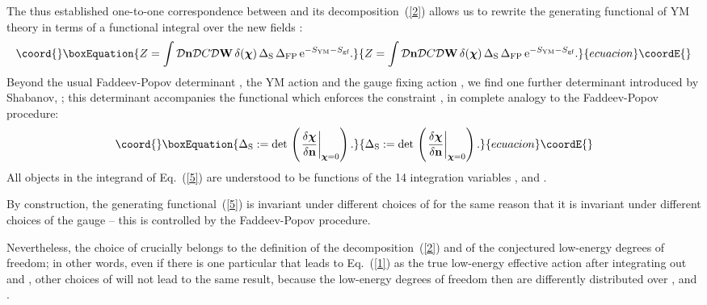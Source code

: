 \documentclass[a4paper,12pt]{article}
\providecommand{\E}{\text{e}}
\providecommand{\re}[1]{~(\ref{#1})}\usepackage{useful_macros}
\begin{document}
The thus established one-to-one correspondence between \myHighlight{$\mA_\mu$}\coordHE{} and
its decomposition\re{2} allows us to rewrite the generating functional
of YM theory in terms of a functional integral over the new fields
\cite{Shabanov:1999xy,Shabanov:1999uv}:
\begin{equation}\coord{}\boxEquation{
Z=\int{\cal D}\mn{\cal D}C{\cal D}\mW\, \delta(\mX)\,
\Delta_{\text{S}}\, \Delta_{\text{FP}}\,\E^{-S_{\text{YM}}
  -S_{\text{gf}}}.\label{5} 
}{
Z=\int{\cal D}\mn{\cal D}C{\cal D}\mW\, \delta(\mX)\,
\Delta_{\text{S}}\, \Delta_{\text{FP}}\,\E^{-S_{\text{YM}}
  -S_{\text{gf}}}.}{ecuacion}\coordE{}\end{equation}
Beyond the usual Faddeev-Popov determinant \coordHE{}, the
YM action \coordHE{} and the gauge fixing action \coordHE{},
we find one further determinant introduced by Shabanov, 
\coordHE{}; this determinant accompanies the \myHighlight{$\delta$}\coordHE{}
functional which enforces the constraint \coordHE{}, in complete analogy
to the Faddeev-Popov procedure:
\begin{equation}\coord{}\boxEquation{
\Delta_{\text{S}}:= \text{det}\, \left(\left.\frac{\delta \mX}{\delta
      \mn} \right|_{\mX=0} \right). \label{6}
}{
\Delta_{\text{S}}:= \text{det}\, \left(\left.\frac{\delta \mX}{\delta
      \mn} \right|_{\mX=0} \right). }{ecuacion}\coordE{}\end{equation}
All objects in the integrand of Eq.\re{5} are understood to be
functions of the 14 integration variables \myHighlight{$\mn$}\coordHE{}, \coordHE{} and
\myHighlight{$\mW_\mu$}\coordHE{}.

By construction, the generating functional\re{5} is invariant under
different choices of \myHighlight{$\mX$}\coordHE{} for the same reason that it is invariant
under different choices of the gauge -- this is controlled by the
Faddeev-Popov procedure.

Nevertheless, the choice of \myHighlight{$\mX$}\coordHE{} crucially belongs to the definition
of the decomposition\re{2} and of the conjectured low-energy degrees
of freedom; in other words, even if there is one particular \myHighlight{$\mX$}\coordHE{} that
leads to Eq.\re{1} as the true low-energy effective action after
integrating out \coordHE{} and \myHighlight{$\mW_\mu$}\coordHE{}, other choices of \myHighlight{$\mX$}\coordHE{} will not
lead to the same result, because the low-energy degrees of freedom
then are differently distributed over \myHighlight{$\mn$}\coordHE{}, \coordHE{} and \myHighlight{$\mW_\mu$}\coordHE{}.
\end{document}
